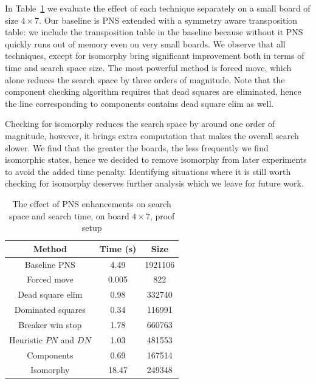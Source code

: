 \documentclass[conference]{IEEEtran}
\theoremstyle{definition}
\newcommand{\pn}{$PN$\xspace}
\newcommand{\dn}{$DN$\xspace}
\begin{document}
In Table~\ref{tab:all_technique} we evaluate the effect of each technique separately on a small board of size $4 \times 7$. Our baseline is PNS extended with a symmetry aware transposition table: we include the transposition table in the baseline because without it PNS quickly runs out of memory even on very small boards. We observe that all techniques, except for isomorphy bring significant improvement both in terms of time and search space size. The most powerful method is forced move, which alone reduces the search space by three orders of magnitude. Note that the component checking algorithm requires that dead squares are eliminated, hence the line corresponding to components contains dead square elim as well.

Checking for isomorphy reduces the search space by around one order of magnitude, however, it brings extra computation that makes the overall search slower. We find that the greater the boards, the less frequently we find isomorphic states, hence we decided to remove isomorphy from later experiments to avoid the added time penalty. Identifying situations where it is still worth checking for isomorphy deserves further analysis which we leave for future work.




\begin{table}[htbp]
\caption{The effect of PNS enhancements on search space and search time, on board $4\times 7$, proof setup}
\begin{center}
\begin{tabular}{ c | c c }
Method & \textbf{Time (s)} & \textbf{Size} \\
\hline 
Baseline PNS & 4.49 & 1921106  \\
Forced move & 0.005 & 822  \\
Dead square elim & 0.98 & 332740  \\
Dominated squares & 0.34 & 116991  \\
Breaker win stop & 1.78 & 660763  \\
Heuristic \pn and \dn & 1.03 & 481553  \\
Components & 0.69 & 167514  \\
Isomorphy & 18.47 & 249348  \\
\hline
\end{tabular}
\label{tab:all_technique}
\end{center}
\end{table}
\end{document}
